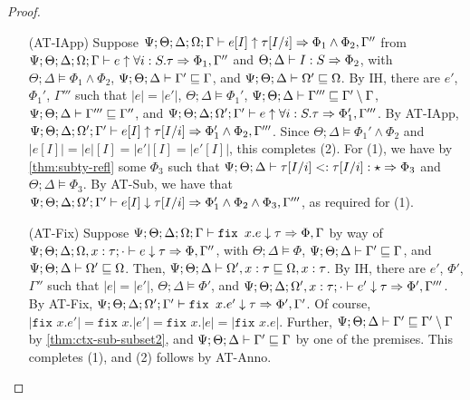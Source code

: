 \begin{proof}
\begin{itemize}
  \item[(AT-IApp)] Suppose $\Psi ; \Theta ; \Delta ; \Omega ; \Gamma \vdash e [I] \uparrow \tau[I/i] \Rightarrow \Phi_1 \wedge \Phi_2,\Gamma''$
  from $\Psi ; \Theta ; \Delta ; \Omega ; \Gamma \vdash e \uparrow \forall i : S.\tau \Rightarrow \Phi_1,\Gamma''$ and
  $\Theta ; \Delta \vdash I : S \Rightarrow \Phi_2$, with
  $\Theta ; \Delta \vDash \Phi_1 \wedge \Phi_2$,
  $\Psi ; \Theta ; \Delta \vdash \Gamma' \sqsubseteq \Gamma$, and
  $\Psi ; \Theta ; \Delta \vdash \Omega' \sqsubseteq \Omega$.
  By IH, there are $e'$, $\Phi_1'$, $\Gamma'''$ such that
  $|e| = |e'|$,
  $\Theta ; \Delta \vDash \Phi_1'$,
  $\Psi ; \Theta ; \Delta \vdash \Gamma''' \sqsubseteq \Gamma' \setminus \Gamma$,
  $\Psi ; \Theta ; \Delta \vdash \Gamma''' \sqsubseteq \Gamma''$, and
  $\Psi ; \Theta ; \Delta ; \Omega' ; \Gamma' \vdash e \uparrow \forall i : S. \tau \Rightarrow \Phi_1',\Gamma'''$.
  By AT-IApp,
  $\Psi ; \Theta ; \Delta ; \Omega' ; \Gamma' \vdash e [I] \uparrow \tau[I/i] \Rightarrow \Phi_1' \wedge \Phi_2,\Gamma'''$.
  Since $\Theta ; \Delta \vDash \Phi_1' \wedge \Phi_2$ and $|e[I]| = |e|[I] = |e'|[I] = |e'[I]|$, this completes (2).
  For (1), we have by \autoref{thm:subty-refl} some $\Phi_3$ such that $\Psi ; \Theta ; \Delta \vdash \tau[I/i] <: \tau[I/i] : \star \Rightarrow \Phi_3$
  and $\Theta ; \Delta \vDash \Phi_3$.
  By AT-Sub, we  have that $\Psi ; \Theta ; \Delta ; \Omega' ; \Gamma' \vdash e [I] \downarrow \tau[I/i] \Rightarrow \Phi_1' \wedge \Phi_2 \wedge \Phi_3,\Gamma'''$,
  as required for (1).
  
  \item[(AT-Fix)] Suppose $\Psi ; \Theta ; \Delta ; \Omega ; \Gamma \vdash \texttt{fix } x.e \downarrow \tau \Rightarrow \Phi,\Gamma$
  by way of $\Psi ; \Theta ; \Delta ; \Omega, x : \tau ; \cdot \vdash e \downarrow \tau \Rightarrow \Phi,\Gamma''$, with
  $\Theta ; \Delta \vDash \Phi$,
  $\Psi ; \Theta ; \Delta \vdash \Gamma' \sqsubseteq \Gamma$, and
  $\Psi ; \Theta ; \Delta \vdash \Omega' \sqsubseteq \Omega$. Then,
  $\Psi ; \Theta ; \Delta \vdash \Omega', x : \tau \sqsubseteq \Omega, x : \tau$.
  By IH, there are $e'$, $\Phi'$, $\Gamma''$ such that
  $|e| = |e'|$,
  $\Theta ; \Delta \vDash \Phi'$, and
  $\Psi ; \Theta ; \Delta ; \Omega', x : \tau ; \cdot \vdash e' \downarrow \tau \Rightarrow \Phi',\Gamma'''$.
  By AT-Fix,
  $\Psi ; \Theta ; \Delta ; \Omega' ; \Gamma' \vdash \texttt{fix } x.e' \downarrow \tau \Rightarrow \Phi',\Gamma'$.
  Of course, $|\texttt{fix }x.e'| = \texttt{fix }x.|e'| = \texttt{fix }x.|e| = |\texttt{fix }x.e|$.
  Further, $\Psi ; \Theta ; \Delta \vdash \Gamma' \sqsubseteq \Gamma' \setminus \Gamma$
  by \autoref{thm:ctx-sub-subset2}, and $\Psi ; \Theta ; \Delta \vdash \Gamma' \sqsubseteq \Gamma$ by one of the premises.
  This completes (1), and (2) follows by AT-Anno.
  

\end{itemize}
\end{proof}
